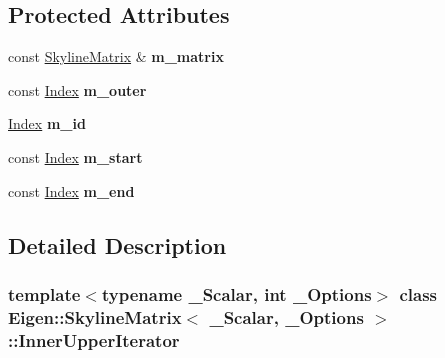 \subsection*{Protected Attributes}
\begin{DoxyCompactItemize}
\item 
\mbox{\label{class_eigen_1_1_skyline_matrix_1_1_inner_upper_iterator_ad725d090c5a8f92f3b1f9f404456b1de}} 
const \hyperlink{class_eigen_1_1_skyline_matrix}{Skyline\+Matrix} \& {\bfseries m\+\_\+matrix}
\item 
\mbox{\label{class_eigen_1_1_skyline_matrix_1_1_inner_upper_iterator_a3d601f167ee66f80a1547f80432901e1}} 
const \hyperlink{group___core___module_a554f30542cc2316add4b1ea0a492ff02}{Index} {\bfseries m\+\_\+outer}
\item 
\mbox{\label{class_eigen_1_1_skyline_matrix_1_1_inner_upper_iterator_af47b99773844e7a83d085f733e13bd32}} 
\hyperlink{group___core___module_a554f30542cc2316add4b1ea0a492ff02}{Index} {\bfseries m\+\_\+id}
\item 
\mbox{\label{class_eigen_1_1_skyline_matrix_1_1_inner_upper_iterator_a0ad952309017c28c20e756fcbae40710}} 
const \hyperlink{group___core___module_a554f30542cc2316add4b1ea0a492ff02}{Index} {\bfseries m\+\_\+start}
\item 
\mbox{\label{class_eigen_1_1_skyline_matrix_1_1_inner_upper_iterator_a39b431529efb9922ae316034329c5397}} 
const \hyperlink{group___core___module_a554f30542cc2316add4b1ea0a492ff02}{Index} {\bfseries m\+\_\+end}
\end{DoxyCompactItemize}


\subsection{Detailed Description}
\subsubsection*{template$<$typename \+\_\+\+Scalar, int \+\_\+\+Options$>$\newline
class Eigen\+::\+Skyline\+Matrix$<$ \+\_\+\+Scalar, \+\_\+\+Options $>$\+::\+Inner\+Upper\+Iterator}



